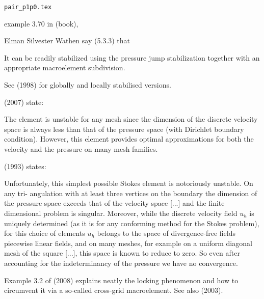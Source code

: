 \begin{flushright} {\tiny {\color{gray} \tt  pair\_p1p0.tex}} \end{flushright}



example 3.70 in \textcite{john16} (book),


Elman Silvester Wathen say (5.3.3) that 
\begin{displayquote}
{\color{darkgray}
It can be readily stabilized using the pressure jump
stabilization together with an appropriate macroelement subdivision.}
\end{displayquote}
See \textcite{nosi98} (1998) for globally and locally stabilised versions. 

\textcite{qizh07b} (2007) state: 
\begin{displayquote}
{\color{darkgray}
The element is unstable for any mesh since
the dimension of the discrete velocity space is always less than that of the pressure space (with
Dirichlet boundary condition).
However, this element provides optimal approximations for both
the velocity and the pressure on many mesh families.} 
\end{displayquote}

\textcite{arno93} (1993) states: 
\begin{displayquote}
{\color{darkgray}
Unfortunately, this simplest possible Stokes element is notoriously unstable. On any tri-
angulation with at least three vertices on the boundary the dimension of the pressure
space exceeds that of the velocity space [...] and the finite
dimensional problem is singular. 
Moreover, while the discrete velocity field $u_h$ is uniquely
determined (as it is for any conforming method for the Stokes problem), for this choice of
elements $u_h$ belongs to the space of divergence-free fields piecewise linear fields, and on
many meshes, for example on a uniform diagonal mesh of the square [...],
this space is known to reduce to zero. So even after accounting for the indeterminancy of
the pressure we have no convergence.}
\end{displayquote}

Example 3.2 of \textcite{bobf08} (2008) explains neatly the locking phenomenon and how 
to circumvent it via a so-called cross-grid macroelement. See also 
\textcite{hokl03} (2003).

